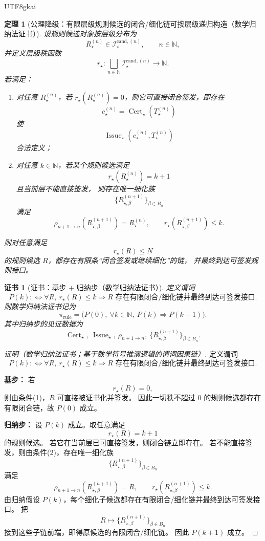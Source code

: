 \documentclass[12pt]{article}
\newtheorem{theorem}{定理}[section]
\newtheorem{Certificate}{证书}[section]
\newcommand{\NN}{\mathbb{N}}
\newcommand{\Cert}{\operatorname{Cert}}
\newcommand{\Issue}{\operatorname{Issue}}
\begin{document}
\begin{CJK*}{UTF8}{gkai}
\begin{theorem}[公理降级：有限层级规则候选的闭合/细化链可按层级递归构造（数学归纳法证书）]
\label{thm:tex37-ch12-induction}
设规则候选对象按层级分布为
\[
  R_\star^{(n)}\in \mathcal I_{\star}^{\mathrm{cand},(n)},
  \qquad
  n\in\NN,
\]
并定义层级秩函数
\[
  r_\star:
  \bigsqcup_{n\in\NN}\mathcal I_{\star}^{\mathrm{cand},(n)}
  \to
  \NN.
\]
若满足：
\begin{enumerate}
  \item 对任意 $R_\star^{(n)}$，若 $r_\star(R_\star^{(n)})=0$，则它可直接闭合签发，即存在
  \[
    c_\star^{(n)}=\Cert_\star(T_\star^{(n)})
  \]
  使
  \[
    \Issue_\star(c_\star^{(n)},T_\star^{(n)})
  \]
  合法定义；
  \item 对任意 $k\in\NN$，若某个规则候选满足
  \[
    r_\star(R_\star^{(n)})=k+1
  \]
  且当前层不能直接签发，
  则存在唯一细化族
  \[
    \{R_{\star,\beta}^{(n+1)}\}_{\beta\in B_n}
  \]
  满足
  \[
    \rho_{n+1\to n}(R_{\star,\beta}^{(n+1)})=R_\star^{(n)},
    \qquad
    r_\star(R_{\star,\beta}^{(n+1)})\le k.
  \]
\end{enumerate}
则对任意满足
\[
  r_\star(R)\le N
\]
的规则候选 $R$，都存在有限条“闭合签发或继续细化”的链，
并最终到达可签发规则接口。
\end{theorem}

\begin{Certificate}[证书：基步 + 归纳步（数学归纳法证书）]
\label{cert:tex37-ch12-induction}
定义谓词
\[
  P(k)
  :
  \Longleftrightarrow
  \forall R,\ r_\star(R)\le k
  \Rightarrow
  \text{$R$ 存在有限闭合/细化链并最终到达可签发接口}.
\]
则数学归纳法证书记为
\[
  \pi_{\mathrm{rule}}
  =
  \bigl(
    P(0),\
    \forall k\in\NN,\ P(k)\Rightarrow P(k+1)
  \bigr).
\]
其中归纳步的见证数据为
\[
  \Cert_\star,\ \Issue_\star,\ \rho_{n+1\to n},\ \{R_{\star,\beta}^{(n+1)}\}_{\beta\in B_n}.
\]
\end{Certificate}

\begin{proof}[证明（数学归纳法证书；基于数学符号推演逻辑的谓词因果链）]
定义谓词
\[
  P(k)
  :
  \Longleftrightarrow
  \forall R,\ r_\star(R)\le k
  \Rightarrow
  \text{$R$ 存在有限闭合/细化链并最终到达可签发接口}.
\]

\textbf{基步：}
若
\[
  r_\star(R)=0,
\]
则由条件(1)，$R$ 可直接被证书化并签发。
因此一切秩不超过 $0$ 的规则候选都存在有限闭合链，故 $P(0)$ 成立。

\textbf{归纳步：}
设 $P(k)$ 成立。取任意满足
\[
  r_\star(R)=k+1
\]
的规则候选。
若它在当前层已可直接签发，则闭合链立即存在。
若不能直接签发，则由条件(2)，存在唯一细化族
\[
  \{R_{\star,\beta}^{(n+1)}\}_{\beta\in B_n}
\]
满足
\[
  \rho_{n+1\to n}(R_{\star,\beta}^{(n+1)})=R,
  \qquad
  r_\star(R_{\star,\beta}^{(n+1)})\le k.
\]
由归纳假设 $P(k)$，每个细化子候选都存在有限闭合/细化链并最终到达可签发接口。
把
\[
  R\longmapsto \{R_{\star,\beta}^{(n+1)}\}_{\beta\in B_n}
\]
接到这些子链前端，即得原候选的有限闭合/细化链。
因此 $P(k+1)$ 成立。


\end{proof}
\end{CJK*}
\end{document}
